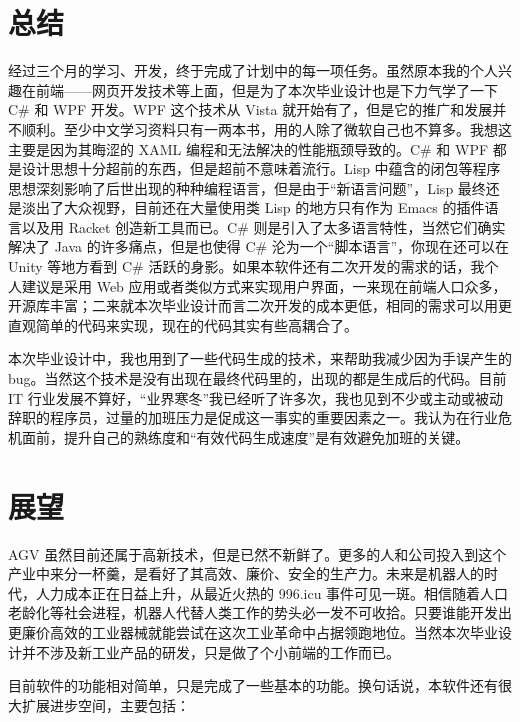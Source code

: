 
\section{总结}

经过三个月的学习、开发，终于完成了计划中的每一项任务。虽然原本我的个人兴趣在前端——网页开发技术等上面，但是为了本次毕业设计也是下力气学了一下 C\# 和 WPF 开发。WPF 这个技术从 Vista 就开始有了，但是它的推广和发展并不顺利。至少中文学习资料只有一两本书，用的人除了微软自己也不算多。我想这主要是因为其晦涩的 XAML 编程和无法解决的性能瓶颈导致的。C\# 和 WPF 都是设计思想十分超前的东西，但是超前不意味着流行。Lisp 中蕴含的闭包等程序思想深刻影响了后世出现的种种编程语言，但是由于``新语言问题''\cite{url:yinwang}，Lisp 最终还是淡出了大众视野，目前还在大量使用类 Lisp 的地方只有作为 Emacs 的插件语言以及用 Racket 创造新工具而已。C\# 则是引入了太多语言特性，当然它们确实解决了 Java 的许多痛点，但是也使得 C\# 沦为一个``脚本语言''，你现在还可以在 Unity 等地方看到 C\# 活跃的身影。如果本软件还有二次开发的需求的话，我个人建议是采用 Web 应用或者类似方式来实现用户界面，一来现在前端人口众多，开源库丰富；二来就本次毕业设计而言二次开发的成本更低，相同的需求可以用更直观简单的代码来实现，现在的代码其实有些高耦合了。

本次毕业设计中，我也用到了一些代码生成的技术，来帮助我减少因为手误产生的 bug。当然这个技术是没有出现在最终代码里的，出现的都是生成后的代码。目前 IT 行业发展不算好，``业界寒冬''我已经听了许多次，我也见到不少或主动或被动辞职的程序员，过量的加班压力是促成这一事实的重要因素之一。我认为在行业危机面前，提升自己的熟练度和``有效代码生成速度''是有效避免加班的关键。

\section{展望}

AGV 虽然目前还属于高新技术，但是已然不新鲜了。更多的人和公司投入到这个产业中来分一杯羹，是看好了其高效、廉价、安全的生产力。未来是机器人的时代，人力成本正在日益上升，从最近火热的 996.icu\cite{url:996icu} 事件可见一斑。相信随着人口老龄化等社会进程，机器人代替人类工作的势头必一发不可收拾。只要谁能开发出更廉价高效的工业器械就能尝试在这次工业革命中占据领跑地位。当然本次毕业设计并不涉及新工业产品的研发，只是做了个小前端的工作而已。

目前软件的功能相对简单，只是完成了一些基本的功能。换句话说，本软件还有很大扩展进步空间，主要包括：

